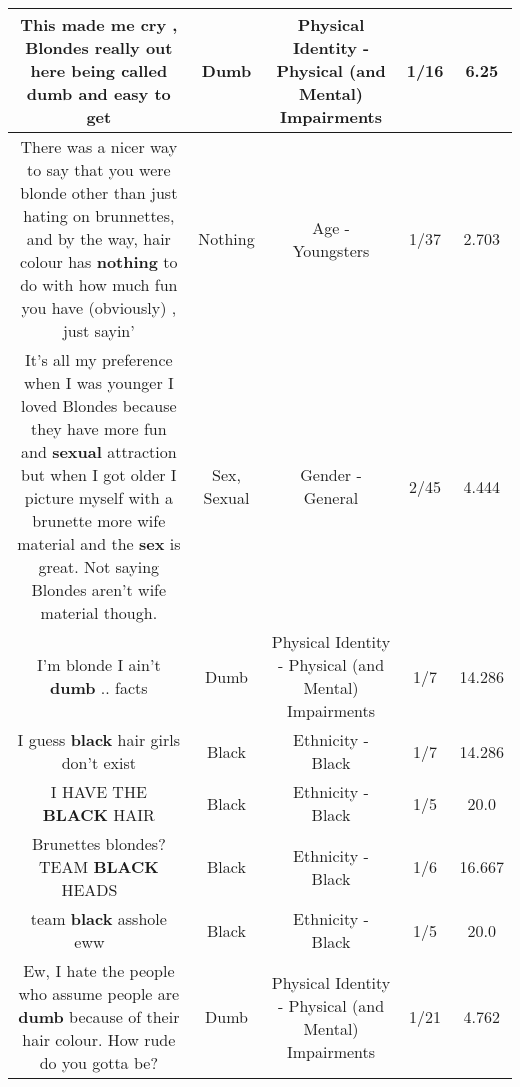 \documentclass[11pt]{article}
\newlength\mylength
\begin{document}
\begin{center}
\begin{longtable}{|C{.65\mylength}|C{.30\mylength}|C{.12\mylength}|C{.12\mylength}|C{.12\mylength}|}
  \small This made me cry , Blondes really out here being called \textbf{dumb} and easy to get\normalsize   & Dumb & Physical Identity - Physical (and Mental) Impairments & 1/16 & 6.25 \\  \hline
  \small There was a nicer way to say that you were blonde other than just hating on brunnettes, and by the way, hair colour has \textbf{nothing} to do with how much fun you have (obviously) , just sayin'\normalsize   & Nothing & Age - Youngsters & 1/37 & 2.703 \\  \hline
  \small It's all my preference when I was younger I loved Blondes because they have more fun and \textbf{sexual} attraction but when I got older I picture myself with a brunette more wife material and the \textbf{sex} is great. Not saying Blondes aren't wife material though.\normalsize   & Sex, Sexual & Gender - General & 2/45 & 4.444 \\  \hline
  \small I'm blonde I ain't \textbf{dumb} .. facts\normalsize   & Dumb & Physical Identity - Physical (and Mental) Impairments & 1/7 & 14.286 \\  \hline
  \small I guess \textbf{black} hair girls don't exist\normalsize   & Black & Ethnicity - Black & 1/7 & 14.286 \\  \hline
  \small I HAVE THE \textbf{BLACK} HAIR\normalsize   & Black & Ethnicity - Black & 1/5 & 20.0 \\  \hline
  \small Brunettes blondes? TEAM \textbf{BLACK} HEADS 👩🏻‍🎤\normalsize   & Black & Ethnicity - Black & 1/6 & 16.667 \\  \hline
  \small team \textbf{black} asshole eww 🤮🤢🤮\normalsize   & Black & Ethnicity - Black & 1/5 & 20.0 \\  \hline
  \small Ew, I hate the people who assume people are \textbf{dumb} because of their hair colour. How rude do you gotta be?\normalsize   & Dumb & Physical Identity - Physical (and Mental) Impairments & 1/21 & 4.762 \\  \hline

\end{longtable}
\end{center}
\end{document}
